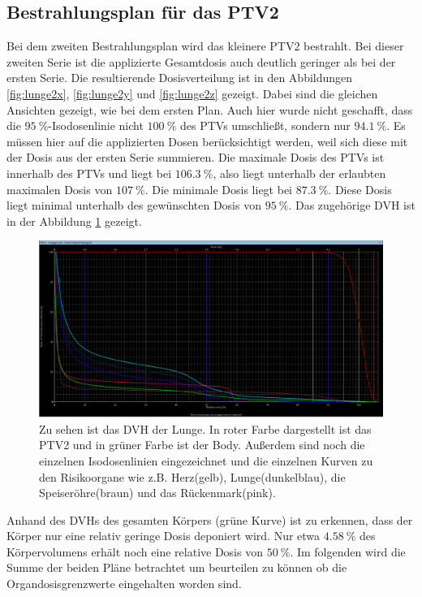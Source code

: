 \subsection{Bestrahlungsplan für das PTV2}
Bei dem zweiten Bestrahlungsplan wird das kleinere PTV2 bestrahlt. Bei dieser zweiten Serie ist die applizierte Gesamtdosis auch deutlich geringer als bei der ersten Serie. Die resultierende Dosisverteilung ist in den Abbildungen \ref{fig:lunge2x}, \ref{fig:lunge2y} und \ref{fig:lunge2z} gezeigt. Dabei sind die gleichen Ansichten gezeigt, wie bei dem ersten Plan.
Auch hier wurde nicht geschafft, dass die $\SI{95}{\percent}$-Isodosenlinie nicht $\SI{100}{\percent}$ des PTVs umschließt, sondern nur $\SI{94,1}{\percent}$. Es müssen hier auf die applizierten Dosen berücksichtigt werden, weil sich diese mit der Dosis aus der ersten Serie summieren. Die maximale Dosis des PTVs ist innerhalb des PTVs und liegt bei $\SI{106.3}{\percent}$, also liegt unterhalb der erlaubten maximalen Dosis von $\SI{107}{\percent}$. Die minimale Dosis liegt bei $\SI{87.3}{\percent}$. Diese Dosis liegt minimal unterhalb des gewünschten Dosis von $\SI{95}{\percent}$.
Das zugehörige DVH ist in der Abbildung \ref{fig:lunge2dvh} gezeigt.

\begin{figure}
	\centering
	\includegraphics[width=0.7\linewidth]{../../Bilder/Lunge2_DVH}
	\caption{Zu sehen ist das DVH der Lunge. In roter Farbe dargestellt ist das PTV2 und in grüner Farbe ist der Body. Außerdem sind noch die einzelnen Isodosenlinien eingezeichnet und die einzelnen Kurven zu den Risikoorgane wie z.B. Herz(gelb), Lunge(dunkelblau), die Speiseröhre(braun) und das Rückenmark(pink).}
	\label{fig:lunge2dvh}
\end{figure}

Anhand des DVHs des gesamten Körpers (grüne Kurve) ist zu erkennen, dass der Körper nur eine relativ geringe Dosis deponiert wird. Nur etwa $\SI{4,58}{\percent}$ des Körpervolumens erhält noch eine relative Dosis von $\SI{50}{\percent}$. Im folgenden wird die Summe der beiden Pläne betrachtet um beurteilen zu können ob die Organdosisgrenzwerte eingehalten worden sind. 

